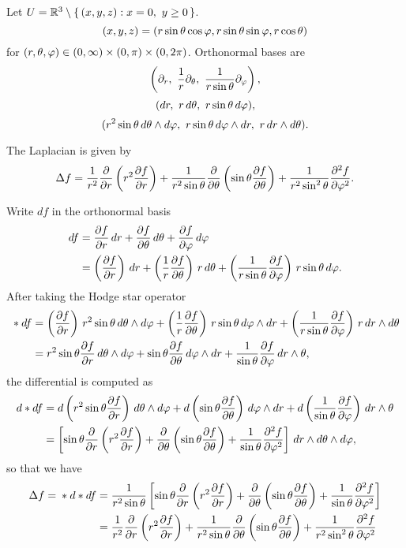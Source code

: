 \documentclass{../../large}
\begin{document}
\begin{prb}
Let $U=\R^3\setminus\{\,(x,y,z):x=0,\ y\ge0\,\}$.
\[(x,y,z)=(r\sin\theta\cos\varphi,r\sin\theta\sin\varphi,r\cos\theta)\]
for $(r,\theta,\varphi)\in(0,\infty)\times(0,\pi)\times(0,2\pi)$.
Orthonormal bases are
\[\left(\pd_r,\ \frac1r\pd_\theta,\ \frac1{r\sin\theta}\pd_\f\right),\]
\[(dr,\ r\,d\theta,\ r\sin\theta\,d\varphi),\]
\[(r^2\sin\theta\,d\theta\wedge d\f,\ r\sin\theta\,d\f\wedge dr,\ r\,dr\wedge d\theta).\]
\begin{parts}
\item
\item The Laplacian is given by
\[\Delta f=\frac1{r^2}\pd{r}\left(r^2\pd{f}{r}\right)+\frac1{r^2\sin\theta}\pd{\theta}\left(\sin\theta\pd{f}{\theta}\right)+\frac1{r^2\sin^2\theta}\pd[2]{f}{\f}.\]
\end{parts}
\end{prb}
\begin{pf}
Write $df$ in the orthonormal basis
\begin{align*}
df&=\pd{f}{r}\,dr+\pd{f}{\theta}\,d\theta+\pd{f}{\f}\,d\f\\
&=\left(\pd{f}{r}\right)\,dr+\left(\frac1r\pd{f}{\theta}\right)\,r\,d\theta+\left(\frac1{r\sin\theta}\pd{f}{\f}\right)\,r\sin\theta\,d\f.
\end{align*}
After taking the Hodge star operator
\begin{align*}
{}*df&=\left(\pd{f}{r}\right)\,r^2\sin\theta\,d\theta\wedge d\f+\left(\frac1r\pd{f}{\theta}\right)\,r\sin\theta\,d\f\wedge dr+\left(\frac1{r\sin\theta}\pd{f}{\f}\right)\,r\,dr\wedge d\theta\\
&=r^2\sin\theta\pd{f}{r}\,d\theta\wedge d\f+\sin\theta\pd{f}{\theta}\,d\f\wedge dr+\frac1{\sin\theta}\pd{f}{\f}\,dr\wedge\theta,
\end{align*}
the differential is computed as
\begin{align*}
d*df&=d\left(r^2\sin\theta\pd{f}{r}\right)\,d\theta\wedge d\f+d\left(\sin\theta\pd{f}{\theta}\right)\,d\f\wedge dr+d\left(\frac1{\sin\theta}\pd{f}{\f}\right)\,dr\wedge\theta\\
&=\left[\sin\theta\pd{r}\left(r^2\pd{f}{r}\right)+\pd{\theta}\left(\sin\theta\pd{f}{\theta}\right)+\frac1{\sin\theta}\pd[2]{f}{\f}\right]\,dr\wedge d\theta\wedge d\f,
\end{align*}
so that we have
\begin{align*}
\Delta f={}*d*df&=\frac1{r^2\sin\theta}\left[\sin\theta\pd{r}\left(r^2\pd{f}{r}\right)+\pd{\theta}\left(\sin\theta\pd{f}{\theta}\right)+\frac1{\sin\theta}\pd[2]{f}{\f}\right]\\
&=\frac1{r^2}\pd{r}\left(r^2\pd{f}{r}\right)+\frac1{r^2\sin\theta}\pd{\theta}\left(\sin\theta\pd{f}{\theta}\right)+\frac1{r^2\sin^2\theta}\pd[2]{f}{\f}
\end{align*}

\end{pf}
\end{document}
